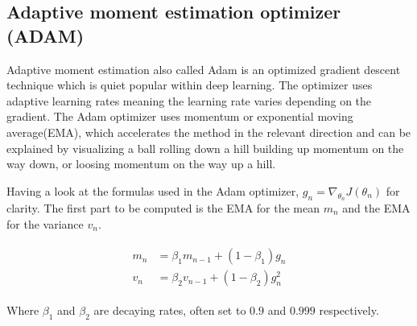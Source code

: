 \documentclass[../main.tex]{subfiles}
\begin{document}

\subsection{Adaptive moment estimation optimizer (ADAM)}
Adaptive moment estimation also called Adam is an optimized gradient descent technique which is quiet popular within deep learning. The optimizer uses adaptive learning rates meaning the learning rate varies depending on the gradient. The Adam optimizer uses momentum or exponential moving average(EMA), which accelerates the method in the relevant direction and can be explained by visualizing a ball rolling down a hill building up momentum on the way down, or loosing momentum on the way up a hill.

Having a look at the formulas used in the Adam optimizer, $g_{n}=\nabla_{\theta_{n}} J\left(\theta_{n}\right)$ for clarity. The first part to be computed is the EMA for the mean $m_n$ and the EMA for the variance $v_n$. 

\begin{align}
\begin{split}
m_{n} &=\beta_{1} m_{n-1}+\left(1-\beta_{1}\right) g_{n} \\
v_{n} &=\beta_{2} v_{n-1}+\left(1-\beta_{2}\right) g_{n}^{2}
\label{eq:m_v_andv_v}
\end{split}
\end{align}

Where $\beta_1$ and $\beta_2$ are decaying rates, often set to $0.9$ and $0.999$ respectively.
\end{document}
